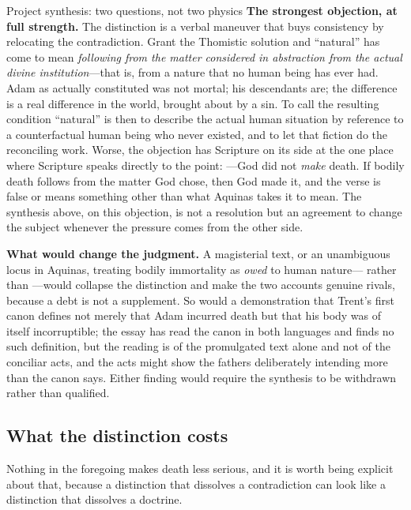 \begin{studybox}{Project synthesis: two questions, not two physics}
\medskip\noindent\textbf{The strongest objection, at full strength.} The distinction is a verbal maneuver that buys consistency by relocating the contradiction. Grant the Thomistic solution and ``natural'' has come to mean \emph{following from the matter considered in abstraction from the actual divine institution}---that is, from a nature that no human being has ever had. Adam as actually constituted was not mortal; his descendants are; the difference is a real difference in the world, brought about by a sin. To call the resulting condition ``natural'' is then to describe the actual human situation by reference to a counterfactual human being who never existed, and to let that fiction do the reconciling work. Worse, the objection has Scripture on its side at the one place where Scripture speaks directly to the point: ---God did not \emph{make} death. If bodily death follows from the matter God chose, then God made it, and the verse is false or means something other than what Aquinas takes it to mean. The synthesis above, on this objection, is not a resolution but an agreement to change the subject whenever the pressure comes from the other side.

\medskip\noindent\textbf{What would change the judgment.} A magisterial text, or an unambiguous locus in Aquinas, treating bodily immortality as \emph{owed} to human nature--- rather than ---would collapse the distinction and make the two accounts genuine rivals, because a debt is not a supplement. So would a demonstration that Trent's first canon defines not merely that Adam incurred death but that his body was of itself incorruptible; the essay has read the canon in both languages and finds no such definition, but the reading is of the promulgated text alone and not of the conciliar acts, and the acts might show the fathers deliberately intending more than the canon says. Either finding would require the synthesis to be withdrawn rather than qualified.
\end{studybox}

\subsection{What the distinction costs}

Nothing in the foregoing makes death less serious, and it is worth being explicit about that, because a distinction that dissolves a contradiction can look like a distinction that dissolves a doctrine.

